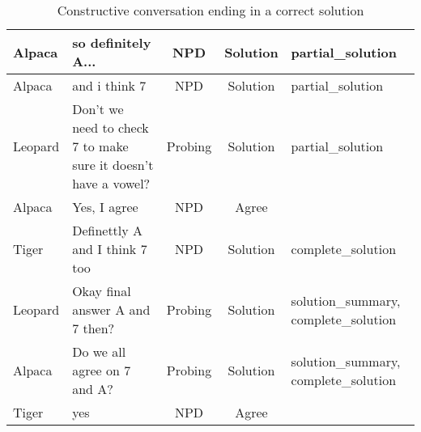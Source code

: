 \documentclass[acmsmall,manuscript,screen]{acmart}
\begin{document}
\begin{table}[h]
{\begin{tabular}{|l|l|c|c|l|}
Alpaca  & so definitely A...  & NPD  & Solution  & partial\_solution \\ \hline 
Alpaca  & and i think 7  & NPD  & Solution  & partial\_solution \\ \hline 
Leopard  & \multicolumn{1}{|p{6cm}|}{ Don't we need to check 7 to make sure it doesn't have a vowel?}  & Probing  & Solution  & partial\_solution \\ \hline 
Alpaca  & Yes, I agree  & NPD  & Agree  &  \\ \hline 
Tiger  & Definettly A and I think 7 too  & NPD  & Solution  & complete\_solution \\ \hline 
Leopard  & Okay final answer A and 7 then?  & Probing  & Solution  & \multicolumn{1}{|p{3.5cm}|}{ solution\_summary, complete\_solution} \\ \hline 
Alpaca  & Do we all agree on 7 and A?  & Probing  & Solution  & \multicolumn{1}{|p{3.5cm}|}{solution\_summary, complete\_solution} \\ \hline 
Tiger  & yes  & NPD  & Agree  & \\ \hline 
    \end{tabular}
    }
    \caption{Constructive conversation ending in a correct solution}
    \label{table:example_annotation_positive}
\end{table}
\end{document}
